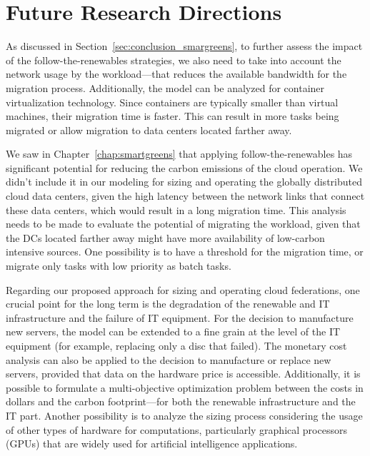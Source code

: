 \section{Future Research Directions}

\label{sec:conclusion_future_research}

As discussed in Section~\ref{sec:conclusion_smargreens}, to further assess the impact of the follow-the-renewables strategies, we also need to take into account the network usage by the workload---that reduces the available bandwidth for the migration process. Additionally, the model can be analyzed for container virtualization technology. Since containers are typically smaller than virtual machines, their migration time is faster. This can result in more tasks being migrated or allow migration to data centers located farther away.


We saw in Chapter~\ref{chap:smartgreens} that applying follow-the-renewables has significant potential for reducing the carbon emissions of the cloud operation. We didn't include it in our modeling for sizing and operating the globally distributed cloud data centers, given the high latency between the network links that connect these data centers, which would result in a long migration time. This analysis needs to be made to evaluate the potential of migrating the workload, given that the DCs located farther away might have more availability of low-carbon intensive sources. One possibility is to have a threshold for the migration time, or migrate only tasks with low priority as batch tasks.


Regarding our proposed approach for sizing and operating cloud federations, one crucial point for the long term is the degradation of the renewable and IT infrastructure and the failure of IT equipment. For the decision to manufacture new servers, the model can be extended to a fine grain at the level of the IT equipment (for example, replacing only a disc that failed). The monetary cost analysis can also be applied to the decision to manufacture or replace new servers, provided that data on the hardware price is accessible. Additionally, it is possible to formulate a multi-objective optimization problem between the costs in dollars and the carbon footprint---for both the renewable infrastructure and the IT part. Another possibility is to analyze the sizing process considering the usage of other types of hardware for computations, particularly graphical processors (GPUs) that are widely used for artificial intelligence applications.

